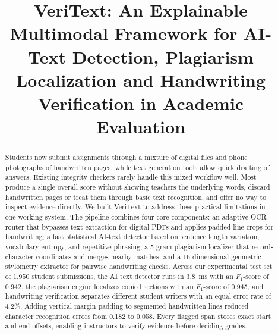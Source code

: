 \documentclass[conference]{IEEEtran}
\begin{document}
\title{VeriText: An Explainable Multimodal Framework for AI-Text Detection, Plagiarism Localization and Handwriting Verification in Academic Evaluation}

\author{
}

\maketitle

\begin{abstract}
Students now submit assignments through a mixture of digital files and phone photographs of handwritten pages, while text generation tools allow quick drafting of answers. Existing integrity checkers rarely handle this mixed workflow well. Most produce a single overall score without showing teachers the underlying words, discard handwritten pages or treat them through basic text recognition, and offer no way to inspect evidence directly. We built VeriText to address these practical limitations in one working system. The pipeline combines four core components: an adaptive OCR router that bypasses text extraction for digital PDFs and applies padded line crops for handwriting; a fast statistical AI-text detector based on sentence length variation, vocabulary entropy, and repetitive phrasing; a 5-gram plagiarism localizer that records character coordinates and merges nearby matches; and a 16-dimensional geometric stylometry extractor for pairwise handwriting checks. Across our experimental test set of 1,950 student submissions, the AI text detector runs in 3.8~ms with an $F_1$-score of 0.942, the plagiarism engine localizes copied sections with an $F_1$-score of 0.945, and handwriting verification separates different student writers with an equal error rate of 4.2\%. Adding vertical margin padding to segmented handwritten lines reduced character recognition errors from 0.182 to 0.058. Every flagged span stores exact start and end offsets, enabling instructors to verify evidence before deciding grades.
\end{abstract}
\end{document}
